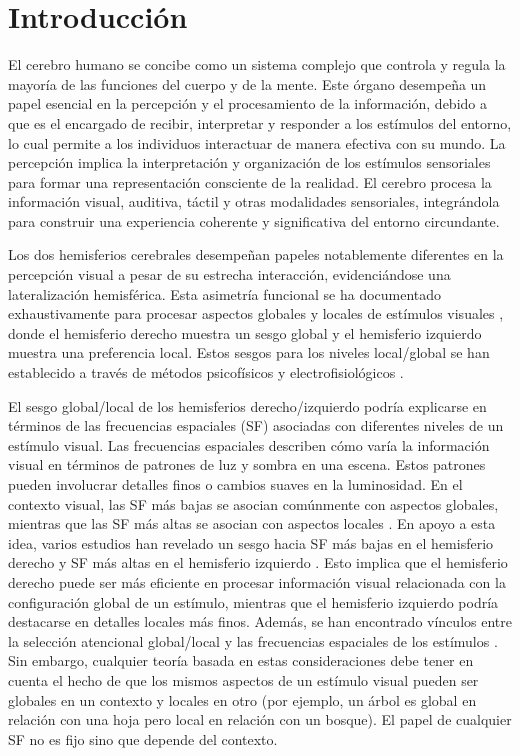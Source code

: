 \chapter*{Introducción}\label{chapter:introduction}
El cerebro humano se concibe como un sistema complejo que controla y regula la mayoría de las funciones del cuerpo y de la mente. Este \'organo desempeña un papel esencial en la percepción y el procesamiento de la información, debido a que es el encargado de recibir, interpretar y responder a los estímulos del entorno, lo cual permite a los individuos interactuar de manera efectiva con su mundo. La percepción implica la interpretación y organización de los estímulos sensoriales para formar una representación consciente de la realidad. El cerebro procesa la información visual, auditiva, táctil y otras modalidades sensoriales, integrándola para construir una experiencia coherente y significativa del entorno circundante.

Los dos hemisferios cerebrales desempeñan papeles notablemente diferentes en la percepción visual a pesar de su estrecha interacción, evidenciándose una lateralización hemisférica. Esta asimetría funcional se ha documentado exhaustivamente para procesar aspectos globales y locales de estímulos visuales \cite{flevaris_spatial_2016}, donde el hemisferio derecho muestra un sesgo global y el hemisferio izquierdo muestra una preferencia local. Estos sesgos para los niveles local/global se han establecido a través de métodos psicofísicos \cite{brederoo_hemispheric_2017, brederoo_reproducibility_2019} y electrofisiológicos \cite{flevaris_attending_2014, iglesias-fuster_asynchronous_2015, jiang_neural_2005}.

El sesgo global/local de los hemisferios derecho/izquierdo podría explicarse en términos de las frecuencias espaciales (SF) asociadas con diferentes niveles de un estímulo visual. Las frecuencias espaciales describen cómo varía la información visual en términos de patrones de luz y sombra en una escena. Estos patrones pueden involucrar detalles finos o cambios suaves en la luminosidad. En el contexto visual, las SF más bajas se asocian comúnmente con aspectos globales, mientras que las SF más altas se asocian con aspectos locales \cite{flevaris_spatial_2016}. En apoyo a esta idea, varios estudios han revelado un sesgo hacia SF más bajas en el hemisferio derecho y SF más altas en el hemisferio izquierdo \cite{flevaris_spatial_2016}. Esto implica que el hemisferio derecho puede ser más eficiente en procesar información visual relacionada con la configuración global de un estímulo, mientras que el hemisferio izquierdo podría destacarse en detalles locales más finos. Además, se han encontrado vínculos entre la selección atencional global/local y las frecuencias espaciales de los est\'imulos \cite{flevaris_spatial_2016}. Sin embargo, cualquier teoría basada en estas consideraciones debe tener en cuenta el hecho de que los mismos aspectos de un estímulo visual pueden ser globales en un contexto y locales en otro (por ejemplo, un árbol es global en relación con una hoja pero local en relación con un bosque). El papel de cualquier SF no es fijo sino que depende del contexto.	

